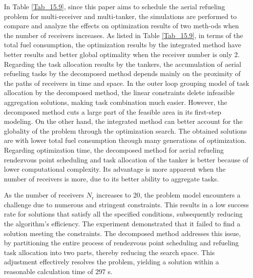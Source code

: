 In Table \ref{Tab_15.9}, since this paper aims to schedule the aerial refueling problem for multi-receiver and multi-tanker, the simulations are performed to compare and analyze the effects on optimization results of two meth-ods when the number of receivers increases. As listed in Table \ref{Tab_15.9}, in terms of the total fuel consumption, the optimization results by the integrated method have better results and better global optimality when the receiver number is only 2. Regarding the task allocation results by the tankers, the accumulation of aerial refueling tasks by the decomposed method depends mainly on the proximity of the paths of receivers in time and space. In the outer loop grouping model of task allocation by the decomposed method, the linear constraints delete infeasible aggregation solutions, making task combination much easier. However, the decomposed method cuts a large part of the feasible area in its first-step modeling. On the other hand, the integrated method can better account for the globality of the problem through the optimization search. The obtained solutions are with lower total fuel consumption through many generations of optimization. Regarding optimization time, the decomposed method for aerial refueling rendezvous point scheduling and task allocation of the tanker is better because of lower computational complexity. Its advantage is more apparent when the number of receivers is more, due to its better ability to aggregate tasks.

As the number of receivers $N_\text{r}$  increases to 20, the problem model encounters a challenge due to numerous and stringent constraints. This results in a low success rate for solutions that satisfy all the specified conditions, subsequently reducing the algorithm's efficiency. The experiment demonstrated that it failed to find a solution meeting the constraints. The decomposed method addresses this issue, by partitioning the entire process of rendezvous point scheduling and refueling task allocation into two parts, thereby reducing the search space. This adjustment effectively resolves the problem, yielding a solution within a reasonable calculation time of 297 s.




